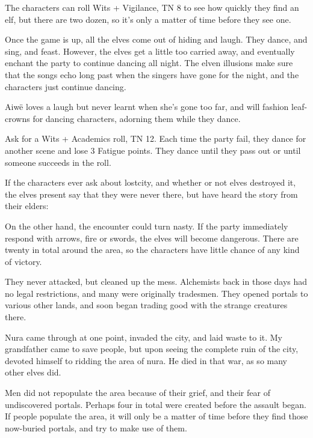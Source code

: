 \begin{multicols}{2}
The characters can roll Wits + Vigilance, TN 8 to see how quickly they find an elf, but there are two dozen, so it's only a matter of time before they see one.

Once the game is up, all the elves come out of hiding and laugh.  They dance, and sing, and feast.  However, the elves get a little too carried away, and eventually enchant the party to continue dancing all night.  The elven illusions make sure that the songs echo long past when the singers have gone for the night, and the characters just continue dancing.
 

Aiw\"{e} loves a laugh but never learnt when she's gone too far, and will fashion leaf-crowns for dancing characters, adorning them while they dance.



Ask for a Wits + Academics roll, TN 12.  Each time the party fail, they dance for another scene and lose 3 Fatigue points.  They dance until they pass out or until someone succeeds in the roll.

If the characters ever ask about \gls{lostcity}, and whether or not elves destroyed it, the elves present say that they were never there, but have heard the story from their elders:

On the other hand, the encounter could turn nasty.
If the party immediately respond with arrows, fire or swords, the elves will become dangerous.
There are twenty in total around the area, so the characters have little chance of any kind of victory.

\begin{speechtext}

	They never attacked, but cleaned up the mess.  Alchemists back in those days had no legal restrictions, and many were originally tradesmen.  They opened portals to various other lands, and soon began trading good with the strange creatures there.

	Nura came through at one point, invaded the city, and laid waste to it.  My grandfather came to save people, but upon seeing the complete ruin of the city, devoted himself to ridding the area of nura.  He died in that war, as so many other elves did.

	Men did not repopulate the area because of their grief, and their fear of undiscovered portals.
	Perhaps four in total were created before the assault began.
	If people populate the area, it will only be a matter of time before they find those now-buried portals, and try to make use of them.


\end{speechtext}
\end{multicols}
